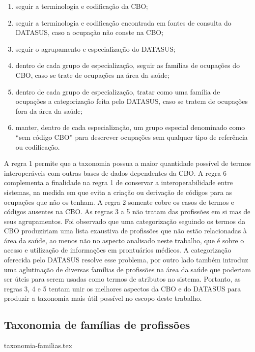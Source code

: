 \documentclass[a4paper,11pt]{article}
\begin{document}
\begin{enumerate}
  \item seguir a terminologia e codificação da CBO;
  \item seguir a terminologia e codificação encontrada em fontes de consulta do DATASUS, caso a ocupação não conste na CBO;
  \item seguir o agrupamento e especialização do DATASUS;
  \item dentro de cada grupo de especialização, seguir as famílias de ocupações do CBO, caso se trate de ocupações na área da saúde;
  \item dentro de cada grupo de especialização, tratar como uma família de ocupações a categorização feita pelo DATASUS, caso se tratem de ocupações fora da área da saúde;
  \item manter, dentro de cada especialização, um grupo especial denominado como ``sem código CBO'' para descrever ocupações sem qualquer tipo de referência ou codificação.
\end{enumerate}

A regra 1 permite que a taxonomia possua a maior quantidade possível de termos interoperáveis com outras bases de dados dependentes da CBO.
A regra 6 complementa a finalidade na regra 1 de conservar a interoperabilidade entre sistemas, na medida em que evita a criação ou derivação de códigos para as ocupações que não os tenham.
A regra 2 somente cobre os casos de termos e códigos ausentes na CBO.
As regras 3 a 5 não tratam das profissões em si mas de seus agrupamentos.
Foi observado que uma categorização seguindo os termos da CBO produziriam uma lista exaustiva de profissões que não estão relacionadas à área da saúde, ao menos não no aspecto analisado neste trabalho, que é sobre o acesso e utilização de informações em prontuários médicos.
A categorização oferecida pelo DATASUS resolve esse problema, por outro lado também introduz uma aglutinação de diversas famílias de profissões na área da saúde que poderiam ser úteis para serem usadas como termos de atributos no sistema.
Portanto, as regras 3, 4 e 5 tentam unir os melhores aspectos da CBO e do DATASUS para produzir a taxonomia mais útil possível no escopo deste trabalho.


\subsection{Taxonomia de famílias de profissões}

{taxonomia-familias.tex}
\end{document}
